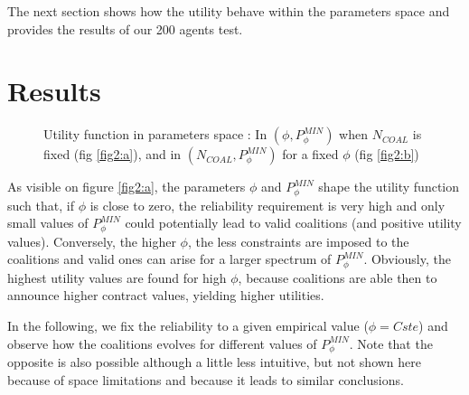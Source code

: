 \documentclass[conference]{IEEEtran}
\begin{document}
The next section shows how the utility behave within the parameters space and provides the results of our 200 agents test.

\section{Results}
\label{sec:results}

\begin{figure}
 \centering
  \hspace{1em}%
\caption{Utility function in parameters space : In $ (\phi, P_{\phi}^{MIN}) $ when $ N_{COAL} $ is fixed (fig \ref{fig2:a}), and in $ (N_{COAL}, P_{\phi}^{MIN}) $ for a fixed $ \phi $ (fig \ref{fig2:b})}
\label{Fig2}
\end{figure}

As visible on figure \ref{fig2:a}, the parameters $\phi$ and $P_{\phi}^{MIN}$ shape the utility function such that, if $ \phi $ is close to zero, the reliability requirement is very high and only small values of $ P_{\phi}^{MIN}$ could potentially lead to valid coalitions (and positive utility values). Conversely, the higher $\phi$, the less constraints are imposed to the coalitions and valid ones can arise for a larger spectrum of $ P_{\phi}^{MIN}$. Obviously, the highest utility values are found for high $ \phi $, because coalitions are able then to announce higher contract values, yielding higher utilities. 

In the following, we fix the reliability to a given empirical value ($\phi = Cste $) and observe how the coalitions evolves for different values of $P_{\phi}^{MIN}$. Note that the opposite is also possible although a little less intuitive, but not shown here because of space limitations and because it leads to similar conclusions. 
\end{document}
